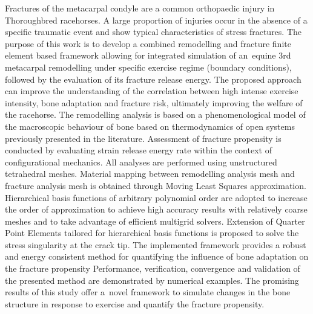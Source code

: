 \documentclass[11pt]{ACMEarticle}
\numberwithin{equation}{section}
\begin{document}
{\small 
	Fractures of the metacarpal condyle are a common orthopaedic injury in Thoroughbred racehorses.  
	A large proportion of injuries occur in the absence of a specific traumatic event and show typical characteristics of stress fractures. 
	The purpose of this work is to develop a combined remodelling and fracture finite element based framework allowing for integrated simulation of an~equine 3rd metacarpal remodelling under specific exercise regime (boundary conditions), followed by the evaluation of its fracture release energy. 
	The proposed approach can improve the understanding of the correlation between high intense exercise intensity, bone adaptation and fracture 
	risk, ultimately improving the welfare of the racehorse. 
	The remodelling analysis is based on a phenomenological model of the macroscopic behaviour of bone based on thermodynamics of open 
	systems previously presented in the literature. 
	Assessment of fracture propensity is conducted by evaluating strain release energy rate within the context of configurational mechanics. 
	All analyses are performed using unstructured tetrahedral meshes. 
	Material mapping between remodelling analysis mesh and fracture analysis mesh is obtained through Moving Least Squares approximation. 
	Hierarchical basis functions of arbitrary polynomial order are adopted to increase the order of approximation to achieve high 
	accuracy results with relatively coarse meshes and to take advantage of efficient multigrid solvers.
	Extension of Quarter Point Elements tailored for hierarchical basis functions is proposed to solve the stress singularity at the 
	crack tip.
	The implemented framework provides a robust and energy consistent method for quantifying the influence of bone adaptation on the
	 fracture propensity
	Performance, verification, convergence and validation of the presented method are demonstrated by numerical examples.
	The promising results of this study offer a~novel framework to simulate changes in the bone structure in response to exercise and 
	quantify the fracture propensity.
	 
	
}
\end{document}
